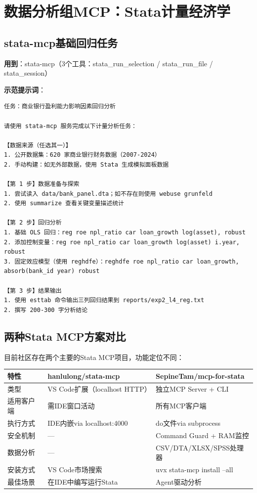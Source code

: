 \section{数据分析组MCP：Stata计量经济学}

\subsection{stata-mcp基础回归任务}

\textbf{用到}：stata-mcp（3个工具：stata\_run\_selection / stata\_run\_file / stata\_session）

\textbf{示范提示词}：

\begin{lstlisting}
任务：商业银行盈利能力影响因素回归分析

请使用 stata-mcp 服务完成以下计量分析任务：

【数据来源（任选其一）】
1. 公开数据集：620 家商业银行财务数据（2007-2024）
2. 手动构建：如无外部数据，使用 Stata 生成模拟面板数据

【第 1 步】数据准备与探索
1. 尝试读入 data/bank_panel.dta；如不存在则使用 webuse grunfeld
2. 使用 summarize 查看关键变量描述统计

【第 2 步】回归分析
1. 基础 OLS 回归：reg roe npl_ratio car loan_growth log(asset), robust
2. 添加控制变量：reg roe npl_ratio car loan_growth log(asset) i.year, robust
3. 固定效应模型（使用 reghdfe）：reghdfe roe npl_ratio car loan_growth, absorb(bank_id year) robust

【第 3 步】结果输出
1. 使用 esttab 命令输出三列回归结果到 reports/exp2_l4_reg.txt
2. 撰写 200-300 字分析结论
\end{lstlisting}

\subsection{两种Stata MCP方案对比}

目前社区存在两个主要的Stata MCP项目，功能定位不同：

\begin{table}[H]
\centering
\begin{tabular}{lp{5cm}p{5cm}}
\toprule
\textbf{特性} & \textbf{hanlulong/stata-mcp} & \textbf{SepineTam/mcp-for-stata} \\
\midrule
类型 & VS Code扩展（localhost HTTP） & 独立MCP Server + CLI \\
适用客户端 & 需IDE窗口活动 & 所有MCP客户端 \\
执行方式 & IDE内嵌via localhost:4000 & do文件via subprocess \\
安全机制 & --- & Command Guard + RAM监控 \\
数据分析 & --- & CSV/DTA/XLSX/SPSS处理器 \\
安装方式 & VS Code市场搜索 & uvx stata-mcp install --all \\
最佳场景 & 在IDE中编写运行Stata & Agent驱动分析 \\
\bottomrule
\end{tabular}
\end{table}

